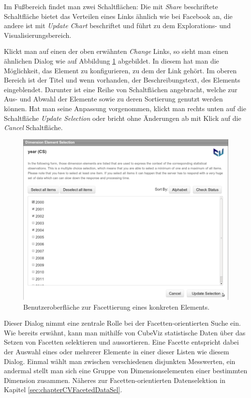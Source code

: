 \documentclass[11pt]{article}
\newcommand{\com}[1]{\marginpar{\em {\small{#1}}}} %
\begin{document}
\newpage 
\noindent
Im Fußbereich findet man zwei Schaltflächen: Die mit \emph{Share} beschriftete Schaltfläche bietet das Verteilen eines Links ähnlich wie bei Facebook an, die andere ist mit \emph{Update Chart} beschriftet und führt zu dem Explorations- und Visualisierungsbereich.

Klickt man auf einen der oben erwähnten \emph{Change} Links, so sieht man einen ähnlichen Dialog wie auf  Abbildung \ref{fig:CubeViz_DimensionElementDialog} abgebildet. In diesem hat man die Möglichkeit, das  Element zu konfigurieren, zu dem der Link gehört. Im oberen Bereich ist der Titel und wenn vorhanden, der Beschreibungstext, des Elements eingeblendet. Darunter ist eine Reihe von Schaltflächen angebracht, welche zur Aus- und Abwahl der Elemente sowie zu deren Sortierung genutzt werden können. Hat man seine Anpassung vorgenommen, klickt man rechts unten auf die Schaltfläche \emph{Update Selection} oder bricht ohne Änderungen ab mit Klick auf die \emph{Cancel} Schaltfläche. \\

%
%
\begin{figure}[h!]
    \centering
    \includegraphics[width=11.4cm]{CubeViz/DimensionElementDialog.pdf}
    \caption{Benutzeroberfläche zur Facettierung eines konkreten Elements.}
    \label{fig:CubeViz_DimensionElementDialog}
\end{figure}

\noindent
Dieser Dialog nimmt eine zentrale Rolle bei der Facetten-orientierten Suche ein. Wie bereits erwähnt, kann man mithilfe von CubeViz statistische Daten über das Setzen von Facetten selektieren und aussortieren. Eine Facette entspricht dabei der Auswahl eines oder mehrerer Elemente in einer dieser Listen wie diesem Dialog. Einmal wählt man zwischen verschiedenen disjunkten Messwerten, ein andermal stellt man sich eine Gruppe von Dimensionselementen einer bestimmten Dimension\com{Kapitel \ref{sec:chapterCVFacetedDataSel} \\ S. \pageref{sec:chapterCVFacetedDataSel}} zusammen. Näheres zur Facetten-orientierten Datenselektion in Kapitel \ref{sec:chapterCVFacetedDataSel}.
\end{document}
